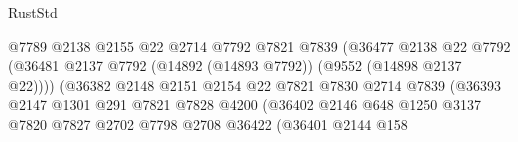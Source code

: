\begin{lexlean}{RustStd}
\begin{coremodule}
                                              @7789
                                              @2138
                                              @2155
                                              @22
                                              @2714
                                              @7792
                                              @7821
                                              @7839
                                              (@36477
                                                @2138
                                                @22
                                                @7792
                                                (@36481
                                                  @2137
                                                  @7792
                                                  (@14892 (@14893 @7792))
                                                  (@9552 (@14898 @2137 @22))))
                                              (@36382
                                                @2148
                                                @2151
                                                @2154
                                                @22
                                                @7821
                                                @7830
                                                @2714
                                                @7839
                                                (@36393
                                                  @2147
                                                  @1301
                                                  @291
                                                  @7821
                                                  @7828
                                                  @4200
                                                  (@36402
                                                    @2146
                                                    @648
                                                    @1250
                                                    @3137
                                                    @7820
                                                    @7827
                                                    @2702
                                                    @7798
                                                    @2708
                                                    @36422
                                                    (@36401
                                                      @2144
                                                      @158

\end{coremodule}
\end{lexlean}
